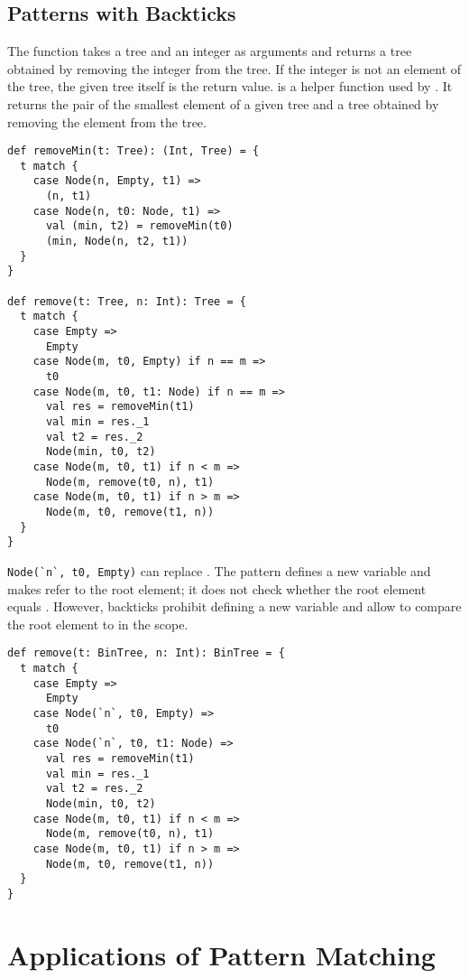 \subsection{Patterns with Backticks}

The function  takes a tree and an integer as arguments and returns a
tree obtained by removing the integer from the tree. If the integer is not an
element of the tree, the given tree itself is the return value. 
is a helper function used by . It returns the pair of the smallest
element of a given tree and a tree obtained by removing the element from the
tree.

\begin{verbatim}
def removeMin(t: Tree): (Int, Tree) = {
  t match {
    case Node(n, Empty, t1) =>
      (n, t1)
    case Node(n, t0: Node, t1) =>
      val (min, t2) = removeMin(t0)
      (min, Node(n, t2, t1))
  }
}

def remove(t: Tree, n: Int): Tree = {
  t match {
    case Empty =>
      Empty
    case Node(m, t0, Empty) if n == m =>
      t0
    case Node(m, t0, t1: Node) if n == m =>
      val res = removeMin(t1)
      val min = res._1
      val t2 = res._2
      Node(min, t0, t2)
    case Node(m, t0, t1) if n < m =>
      Node(m, remove(t0, n), t1)
    case Node(m, t0, t1) if n > m =>
      Node(m, t0, remove(t1, n))
  }
}
\end{verbatim}

\verb!Node(`n`, t0, Empty)! can replace
. The pattern  defines
a new variable  and makes  refer to the
root element; it does not check whether the root element equals .
However, backticks prohibit defining a new variable and allow to compare the root
element to  in the scope.

\begin{verbatim}
def remove(t: BinTree, n: Int): BinTree = {
  t match {
    case Empty =>
      Empty
    case Node(`n`, t0, Empty) =>
      t0
    case Node(`n`, t0, t1: Node) =>
      val res = removeMin(t1)
      val min = res._1
      val t2 = res._2
      Node(min, t0, t2)
    case Node(m, t0, t1) if n < m =>
      Node(m, remove(t0, n), t1)
    case Node(m, t0, t1) if n > m =>
      Node(m, t0, remove(t1, n))
  }
}
\end{verbatim}

\section{Applications of Pattern Matching}

